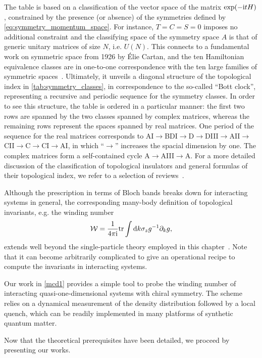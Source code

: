 The table is based on a classification of the vector space of the matrix $\exp(-\mathrm i t H)$, constrained by the presence (or absence) of the symmetries defined by \cref{eq:symmetry_momentum_space}.
For instance, $T=C=S=0$ imposes no additional constraint and the classifying space of the symmetry space $A$ is that of generic unitary matrices of size $N$, i.e. $U(N)$.
This connects to a fundamental work on symmetric space from 1926 by Élie Cartan, and the ten Hamiltonian equivalence classes are in one-to-one correspondence with the ten large families of symmetric spaces~\cite{Heinzner2005}.
Ultimately, it unveils a diagonal structure of the topological index in \cref{tab:symmetry_classes}, in correspondence to the so-called ``Bott clock'', representing a recursive and periodic sequence for the symmetry classes.
In order to see this structure, the table is ordered in a particular manner: the first two rows are spanned by the two classes spanned by complex matrices, whereas the remaining rows represent the spaces spanned by real matrices.
One period of the sequence for the real matrices corresponds to AI$\rightarrow$BDI$\rightarrow$D$\rightarrow$DIII$\rightarrow$AII$\rightarrow$CII$\rightarrow$C$\rightarrow$CI$\rightarrow$AI, in which ``$\rightarrow$'' increases the spacial dimension by one.
The complex matrices form a self-contained cycle A$\rightarrow$AIII$\rightarrow$A.
For a more detailed discussion of the classification of topological insulators and general formulas of their topological index, we refer to a selection of reviews~\cite{Hasan2010,Chiu2016,Cooper2019}.

Although the prescription in terms of Bloch bands breaks down for interacting systems in general, the corresponding many-body definition of topological invariants, e.g. the winding number
\begin{align}
    \mathcal W = \frac{1}{4\pi\mathrm i} {\rm tr}\int\mathrm d k \sigma_z g^{-1}\partial_k g,
    \label{eq:winding_number_greens}
\end{align}
extends well beyond the single-particle theory employed in this chapter~\cite{Gurarie2011,Manmana2012}.
Note that it can become arbitrarily complicated to give an operational recipe to compute the invariants in interacting systems.

Our work in \cref{mcd1} provides a simple tool to probe the winding number of interacting quasi-one-dimensional systems with chiral symmetry.
The scheme relies on a dynamical measurement of the density distribution followed by a local quench, which can be readily implemented in many platforms of synthetic quantum matter.

Now that the theoretical prerequisites have been detailed, we proceed by presenting our works.
